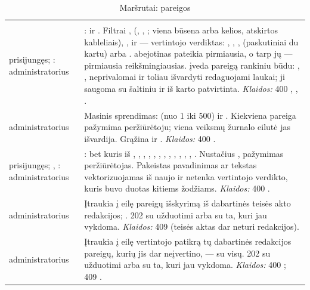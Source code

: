\begin{xltabular}{\textwidth}{@{}L{19mm}Y@{}}
\caption{Maršrutai: pareigos}\label{tab:api:obligations}\\
\toprule {} &  \\ \midrule \endfirsthead
\toprule {} &  \\ \midrule \endhead
\bottomrule \endlastfoot
{}
prisijungęs; : administratorius & :  ir .
  Filtrai ,  (, , ;
  viena būsena arba kelios, atskirtos kableliais),
  ,  ir  --- vertintojo verdiktas: ,
  , ,  (paskutiniai du kartu) arba .
   abejotinas pateikia pirmiausia, o tarp jų --- pirmiausia reikšmingiausias.
   įveda pareigą rankiniu būdu: , , neprivalomai
   ir toliau išvardyti redaguojami laukai; ji saugoma su šaltiniu
   ir iš karto patvirtinta. \emph{Klaidos:} 400 ,
  , . \\
\addlinespace
{}
administratorius & Masinis sprendimas:  (nuo 1 iki 500) ir . Kiekviena
  pareiga pažymima peržiūrėtoju; viena veiksmų žurnalo eilutė jas išvardija. Grąžina
   ir . \emph{Klaidos:} 400 . \\
\addlinespace
{}
prisijungęs; , : administratorius & : bet kuris iš
  , , , , , ,
  , , , , ,
  , . Nustačius , pažymimas peržiūrėtojas. Pakeistas
  pavadinimas ar tekstas vektorizuojamas iš naujo ir netenka vertintojo verdikto, kuris buvo
  duotas kitiems žodžiams. \emph{Klaidos:} 400 . \\
\addlinespace
{}
administratorius & Įtraukia į eilę pareigų išskyrimą iš dabartinės teisės akto redakcijos;
  . 202 su užduotimi arba su ta, kuri jau vykdoma. \emph{Klaidos:} 409
   (teisės aktas dar neturi redakcijos). \\
\addlinespace
{}
administratorius & Įtraukia į eilę vertintojo patikrą tų dabartinės redakcijos pareigų, kurių
  jis dar neįvertino, --- su  visų. 202 su užduotimi arba su ta, kuri jau vykdoma.
  \emph{Klaidos:} 400 ; 409 . \\
\end{xltabular}

